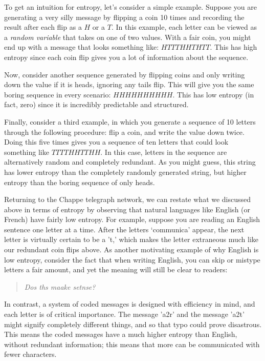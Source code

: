 \documentclass[UTF8]{book}
\begin{document}
\begin{CJK}{UTF8}{gbsn}
To get an intuition for entropy, let's consider a simple example. Suppose you are generating a very silly message by flipping a coin 10 times and recording the result after each flip as a $H$ or a $T$. In this example, each letter can be viewed as a \emph{random variable} that takes on one of two values. With a fair coin, you might end up with a message that looks something like: $HTTTHHTHTT$. This has high entropy since each coin flip gives you a lot of information about the sequence.

Now, consider another sequence generated by flipping coins and only writing down the value if it is heads, ignoring any tails flip. This will give you the same boring sequence in every scenario: $HHHHHHHHHH$. This has low entropy (in fact, zero) since it is incredibly predictable and structured.

Finally, consider a third example, in which you generate a sequence of 10 letters through the following procedure: flip a coin, and write the value down twice. Doing this five times gives you a sequence of ten letters that could look something like $TTTTHHTTHH$. In this case, letters in the sequence are alternatively random and completely redundant. As you might guess, this string has lower entropy than the completely randomly generated string, but higher entropy than the boring sequence of only heads.

Returning to the Chappe telegraph network, we can restate what we discussed above in terms of entropy by observing that natural languages like English (or French) have fairly low entropy. For example, suppose you are reading an English sentence one letter at a time. After the letters `communica' appear, the next letter is virtually certain to be a 't,' which makes the letter extraneous much like our redundant coin flips above. As another motivating example of why English is low entropy, consider the fact that when writing English, you can skip or mistype letters a fair amount, and yet the meaning will still be clear to readers:

\begin{quotation}
\centering
\emph{Dos ths maake setnse?}
\end{quotation}

In contrast, a system of coded messages is designed with efficiency in mind, and each letter is of critical importance. The message 'a2r' and the message 'a2t' might signify completely different things, and so that typo could prove disastrous. This means the coded messages have a much higher entropy than English, without redundant information; this means that more can be communicated with fewer characters.


\end{CJK}
\end{document}
